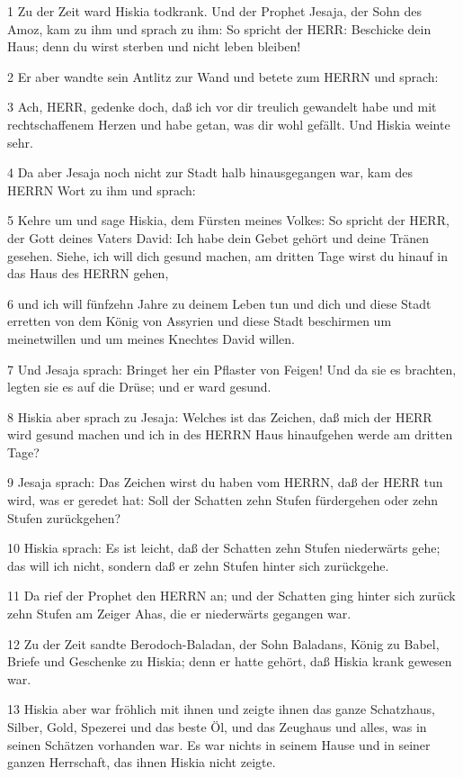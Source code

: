\par 1 Zu der Zeit ward Hiskia todkrank. Und der Prophet Jesaja, der Sohn des Amoz, kam zu ihm und sprach zu ihm: So spricht der HERR: Beschicke dein Haus; denn du wirst sterben und nicht leben bleiben!
\par 2 Er aber wandte sein Antlitz zur Wand und betete zum HERRN und sprach:
\par 3 Ach, HERR, gedenke doch, daß ich vor dir treulich gewandelt habe und mit rechtschaffenem Herzen und habe getan, was dir wohl gefällt. Und Hiskia weinte sehr.
\par 4 Da aber Jesaja noch nicht zur Stadt halb hinausgegangen war, kam des HERRN Wort zu ihm und sprach:
\par 5 Kehre um und sage Hiskia, dem Fürsten meines Volkes: So spricht der HERR, der Gott deines Vaters David: Ich habe dein Gebet gehört und deine Tränen gesehen. Siehe, ich will dich gesund machen, am dritten Tage wirst du hinauf in das Haus des HERRN gehen,
\par 6 und ich will fünfzehn Jahre zu deinem Leben tun und dich und diese Stadt erretten von dem König von Assyrien und diese Stadt beschirmen um meinetwillen und um meines Knechtes David willen.
\par 7 Und Jesaja sprach: Bringet her ein Pflaster von Feigen! Und da sie es brachten, legten sie es auf die Drüse; und er ward gesund.
\par 8 Hiskia aber sprach zu Jesaja: Welches ist das Zeichen, daß mich der HERR wird gesund machen und ich in des HERRN Haus hinaufgehen werde am dritten Tage?
\par 9 Jesaja sprach: Das Zeichen wirst du haben vom HERRN, daß der HERR tun wird, was er geredet hat: Soll der Schatten zehn Stufen fürdergehen oder zehn Stufen zurückgehen?
\par 10 Hiskia sprach: Es ist leicht, daß der Schatten zehn Stufen niederwärts gehe; das will ich nicht, sondern daß er zehn Stufen hinter sich zurückgehe.
\par 11 Da rief der Prophet den HERRN an; und der Schatten ging hinter sich zurück zehn Stufen am Zeiger Ahas, die er niederwärts gegangen war.
\par 12 Zu der Zeit sandte Berodoch-Baladan, der Sohn Baladans, König zu Babel, Briefe und Geschenke zu Hiskia; denn er hatte gehört, daß Hiskia krank gewesen war.
\par 13 Hiskia aber war fröhlich mit ihnen und zeigte ihnen das ganze Schatzhaus, Silber, Gold, Spezerei und das beste Öl, und das Zeughaus und alles, was in seinen Schätzen vorhanden war. Es war nichts in seinem Hause und in seiner ganzen Herrschaft, das ihnen Hiskia nicht zeigte.
